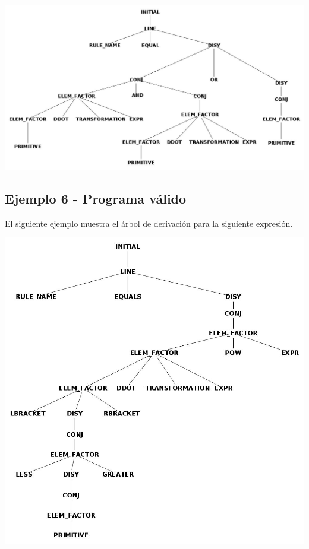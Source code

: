 

\centerline{\includegraphics[scale=0.40]{arboles_derivacion/Ejemplo_and_or1.jpg}}

\subsection{Ejemplo 6 - Programa v\'alido}

El siguiente ejemplo muestra el \'arbol de derivaci\'on para la siguiente expresi\'on.



\centerline{\includegraphics[scale=0.40]{arboles_derivacion/brackets_less_greater1.jpg}}

